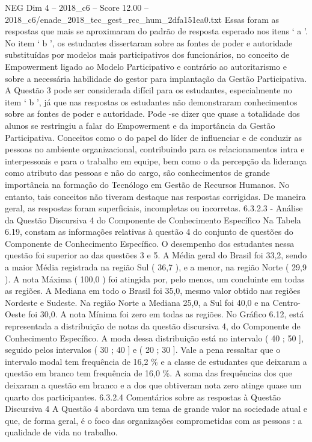 \begin{textsample}{NEG Dim 4 – 2018\_c6 – Score 12.00 – 2018\_c6/enade\_2018\_tec\_gest\_rec\_hum\_2dfa151ea0.txt}
Essas foram as respostas que mais se aproximaram do padrão de resposta esperado nos itens ‘ a ’.
No item ‘ b ’, os estudantes dissertaram sobre as fontes de poder e autoridade substituídas por modelos mais participativos dos funcionários, no conceito de Empowerment ligado ao Modelo Participativo e contrário ao autoritarismo e sobre a necessária habilidade do gestor para implantação da Gestão Participativa.
A Questão 3 pode ser considerada difícil para os estudantes, especialmente no item ‘ b ’, já que nas respostas os estudantes não demonstraram conhecimentos sobre as fontes de poder e autoridade.
Pode -se dizer que quase a totalidade dos alunos se restringiu a falar do Empowerment e da importância da Gestão Participativa.
Conceitos como o do papel do líder de influenciar e de conduzir as pessoas no ambiente organizacional, contribuindo para os relacionamentos intra e interpessoais e para o trabalho em equipe, bem como o da percepção da liderança como atributo das pessoas e não do cargo, são conhecimentos de grande importância na formação do Tecnólogo em Gestão de Recursos Humanos.
No entanto, tais conceitos não tiveram destaque nas respostas corrigidas.
De maneira geral, as respostas foram superficiais, incompletas ou incorretas. 6.3.2.3 - Análise da Questão Discursiva 4 do Componente de Conhecimento Específico Na Tabela 6.19, constam as informações relativas à questão 4 do conjunto de questões do Componente de Conhecimento Específico.
O desempenho dos estudantes nessa questão foi superior ao das questões 3 e 5.
A Média geral do Brasil foi 33,2, sendo a maior Média registrada na região Sul ( 36,7 ), e a menor, na região Norte ( 29,9 ).
A nota Máxima ( 100,0 ) foi atingida por, pelo menos, um concluinte em todas as regiões.
A Mediana em todo o Brasil foi 35,0, mesmo valor obtido nas regiões Nordeste e Sudeste.
Na região Norte a Mediana 25,0, a Sul foi 40,0 e na Centro-Oeste foi 30,0.
A nota Mínima foi zero em todas as regiões.
No Gráfico 6.12, está representada a distribuição de notas da questão discursiva 4, do Componente de Conhecimento Específico.
A moda dessa distribuição está no intervalo ( 40 ; 50 ], seguido pelos intervalos ( 30 ; 40 ] e ( 20 ; 30 ].
Vale a pena ressaltar que o intervalo modal tem frequência de 16,2 \% e a classe de estudantes que deixaram a questão em branco tem frequência de 16,0 \%.
A soma das frequências dos que deixaram a questão em branco e a dos que obtiveram nota zero atinge quase um quarto dos participantes. 6.3.2.4 Comentários sobre as respostas à Questão Discursiva 4 A Questão 4 abordava um tema de grande valor na sociedade atual e que, de forma geral, é o foco das organizações comprometidas com as pessoas : a qualidade de vida no trabalho.

\end{textsample}
